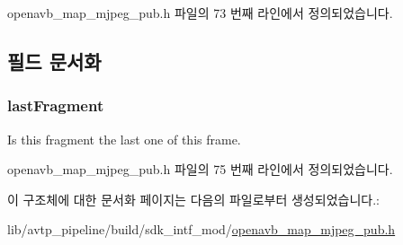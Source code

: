 openavb\+\_\+map\+\_\+mjpeg\+\_\+pub.\+h 파일의 73 번째 라인에서 정의되었습니다.



\subsection{필드 문서화}
\subsubsection[{\texorpdfstring{last\+Fragment}{lastFragment}}]{ last\+Fragment}\hypertarget{structmedia__q__item__map__mjpeg__pub__data__t_a1db3399abba4fe879f482e7b6b144ace}{}\label{structmedia__q__item__map__mjpeg__pub__data__t_a1db3399abba4fe879f482e7b6b144ace}


Is this fragment the last one of this frame. 



openavb\+\_\+map\+\_\+mjpeg\+\_\+pub.\+h 파일의 75 번째 라인에서 정의되었습니다.



이 구조체에 대한 문서화 페이지는 다음의 파일로부터 생성되었습니다.\+:\begin{DoxyCompactItemize}
\item 
lib/avtp\+\_\+pipeline/build/sdk\+\_\+intf\+\_\+mod/\hyperlink{build_2sdk__intf__mod_2openavb__map__mjpeg__pub_8h}{openavb\+\_\+map\+\_\+mjpeg\+\_\+pub.\+h}\end{DoxyCompactItemize}
